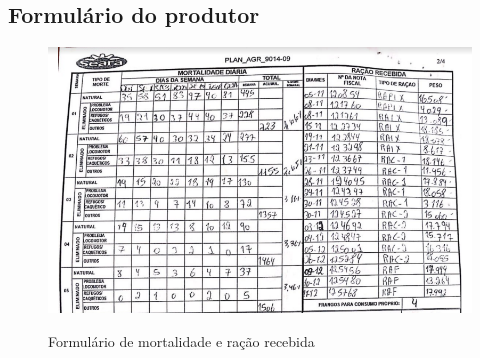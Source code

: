 
\begin{anexosenv}
\partanexos

\chapter{Formulário do produtor}     %
\label{chap:anexoA}

\begin{figure}[!htb]
    \centering
    \caption{Formulário de mortalidade e ração recebida}
    \includegraphics[width=1.0\textwidth]{./dados/figuras/planilha_mortalidade.png}
    \label{fig:planilha_mortalidade}
\end{figure}







\end{anexosenv}
